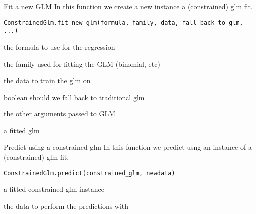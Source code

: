 \documentclass[a4paper]{book}
\begin{document}
%
\begin{Description}\relax
Fit a new GLM
In this function we create a new instance a (constrained)
glm fit.
\end{Description}
%
\begin{Usage}
\begin{verbatim}
ConstrainedGlm.fit_new_glm(formula, family, data, fall_back_to_glm, ...)
\end{verbatim}
\end{Usage}
%
\begin{Arguments}
\begin{ldescription}
\item[\code{formula}] the formula to use for the regression

\item[\code{family}] the family used for fitting the GLM (binomial, etc)

\item[\code{data}] the data to train the glm on

\item[\code{fall\_back\_to\_glm}] boolean should we fall back to traditional glm

\item[\code{...}] the other arguments passed to GLM
\end{ldescription}
\end{Arguments}
%
\begin{Value}
a fitted glm
\end{Value}
%
\begin{Description}\relax
Predict using a constrained glm
In this function we predict usng an instance of a (constrained)
glm fit.
\end{Description}
%
\begin{Usage}
\begin{verbatim}
ConstrainedGlm.predict(constrained_glm, newdata)
\end{verbatim}
\end{Usage}
%
\begin{Arguments}
\begin{ldescription}
\item[\code{constrained\_glm}] a fitted constrained glm instance

\item[\code{newdata}] the data to perform the predictions with
\end{ldescription}
\end{Arguments}
\end{document}
